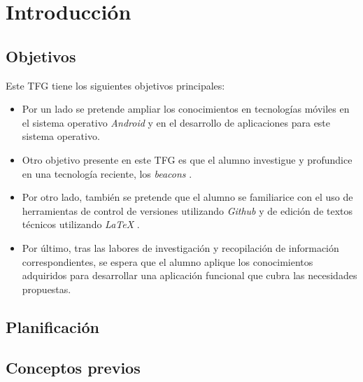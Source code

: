 %
%


\chapter{Introducción} \label{chap:Introducción}  

\section{Objetivos}

Este TFG tiene los siguientes objetivos principales:

	
\begin{itemize}
\item  	Por un lado se pretende ampliar los conocimientos en tecnologías móviles en el sistema operativo \textit{Android} \cite{URL::Android} y en el desarrollo de aplicaciones para este sistema operativo.
\item Otro objetivo presente en este TFG es que el alumno investigue y profundice en una tecnología reciente, los \textit{beacons} \cite{URL::Beacon}.
\item Por otro lado, también se pretende que el alumno se familiarice con el uso de herramientas de control de versiones utilizando \textit{Github} \cite{URL::Github} y de edición de textos técnicos utilizando \textit{LaTeX}  \cite{URL::LaTeX}.
\item  Por último, tras las labores de investigación y recopilación de información correspondientes, se espera que el alumno aplique los conocimientos adquiridos para desarrollar una aplicación funcional que cubra las necesidades propuestas.
\end{itemize}

\section{Planificación}

\section{Conceptos previos}